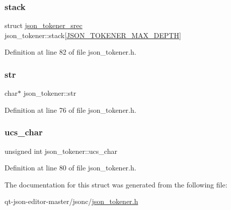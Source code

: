\mbox{\label{structjson__tokener_a1499f97597246a18357b874e1805a678}} 
\subsubsection{\texorpdfstring{stack}{stack}}
{\footnotesize\ttfamily struct \hyperlink{structjson__tokener__srec}{json\+\_\+tokener\+\_\+srec} json\+\_\+tokener\+::stack\mbox{[}\hyperlink{json__tokener_8h_ac4299cf4ed799b028e61cf7b2b0d5f1f}{J\+S\+O\+N\+\_\+\+T\+O\+K\+E\+N\+E\+R\+\_\+\+M\+A\+X\+\_\+\+D\+E\+P\+TH}\mbox{]}}



Definition at line 82 of file json\+\_\+tokener.\+h.

\mbox{\label{structjson__tokener_a9772e2170322a19d8da6ce5d7dc46895}} 
\subsubsection{\texorpdfstring{str}{str}}
{\footnotesize\ttfamily char$\ast$ json\+\_\+tokener\+::str}



Definition at line 76 of file json\+\_\+tokener.\+h.

\mbox{\label{structjson__tokener_a32fa73e43fb760e6845231a8482eb064}} 
\subsubsection{\texorpdfstring{ucs\+\_\+char}{ucs\_char}}
{\footnotesize\ttfamily unsigned int json\+\_\+tokener\+::ucs\+\_\+char}



Definition at line 80 of file json\+\_\+tokener.\+h.



The documentation for this struct was generated from the following file\+:\begin{DoxyCompactItemize}
\item 
qt-\/json-\/editor-\/master/jsonc/\hyperlink{json__tokener_8h}{json\+\_\+tokener.\+h}\end{DoxyCompactItemize}
